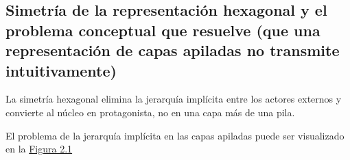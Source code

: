 \documentclass[12pt, a4paper]{article}
\begin{document}
        \subsection{Simetría de la representación hexagonal y el problema conceptual que resuelve (que una representación de capas apiladas no transmite intuitivamente)}
        La simetría hexagonal elimina la jerarquía implícita entre los actores externos y convierte al núcleo en protagonista, no en una capa más de una pila.

        El problema de la jerarquía implícita en las capas apiladas puede ser visualizado en la \hyperref[fig:Figura2.1]{Figura 2.1}
        \begin{table}[H]
            \centering
            \caption{Figura 2.1: Problema de la jerarquía implícita en las capas apiladas}
            \label{fig:Figura2.1}
        \end{table}
\end{document}
